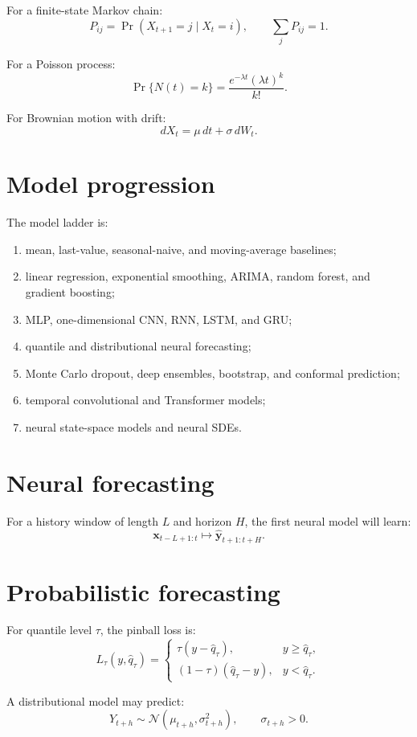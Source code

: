 \documentclass[11pt,a4paper]{report}
\begin{document}
For a finite-state Markov chain:
\[
P_{ij}=\Pr(X_{t+1}=j\mid X_t=i), \qquad \sum_jP_{ij}=1.
\]

For a Poisson process:
\[
\Pr\{N(t)=k\}=\frac{e^{-\lambda t}(\lambda t)^k}{k!}.
\]

For Brownian motion with drift:
\[
dX_t=\mu\,dt+\sigma\,dW_t.
\]

\section{Model progression}

The model ladder is:
\begin{enumerate}
\item mean, last-value, seasonal-naive, and moving-average baselines;
\item linear regression, exponential smoothing, ARIMA, random forest, and gradient boosting;
\item MLP, one-dimensional CNN, RNN, LSTM, and GRU;
\item quantile and distributional neural forecasting;
\item Monte Carlo dropout, deep ensembles, bootstrap, and conformal prediction;
\item temporal convolutional and Transformer models;
\item neural state-space models and neural SDEs.
\end{enumerate}

\section{Neural forecasting}

For a history window of length $L$ and horizon $H$, the first neural model will learn:
\[
\mathbf{x}_{t-L+1:t}\longmapsto \widehat{\mathbf{y}}_{t+1:t+H}.
\]

\section{Probabilistic forecasting}

For quantile level $\tau$, the pinball loss is:
\[
L_\tau(y,\widehat q_\tau)=
\begin{cases}
\tau(y-\widehat q_\tau), & y\geq\widehat q_\tau,\\
(1-\tau)(\widehat q_\tau-y), & y<\widehat q_\tau.
\end{cases}
\]

A distributional model may predict:
\[
Y_{t+h}\sim\mathcal{N}(\mu_{t+h},\sigma_{t+h}^2), \qquad \sigma_{t+h}>0.
\]
\end{document}
